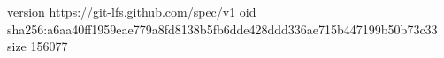 version https://git-lfs.github.com/spec/v1
oid sha256:a6aa40ff1959eae779a8fd8138b5fb6dde428ddd336ae715b447199b50b73c33
size 156077
